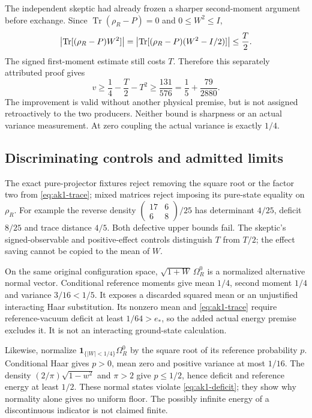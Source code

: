 The independent skeptic had already frozen a sharper second-moment argument before exchange. Since $\operatorname{Tr}(\rho_R-P)=0$ and $0\le W^2\le I$,
\begin{equation}
 \left|\operatorname{Tr}[(\rho_R-P)W^2]\right|
 =\left|\operatorname{Tr}[(\rho_R-P)(W^2-I/2)]\right|
 \le\frac T2.
 \label{eq:ak1-effect}
\end{equation}
The signed first-moment estimate still costs $T$. Therefore this separately attributed proof gives
\begin{equation}
 v\ge\frac14-\frac T2-T^2
 \ge\frac{131}{576}=\frac15+\frac{79}{2880}.
 \label{eq:ak1-skeptic-floor}
\end{equation}
The improvement is valid without another physical premise, but is not assigned retroactively to the two producers. Neither bound is sharpness or an actual variance measurement. At zero coupling the actual variance is exactly $1/4$.

\subsection{Discriminating controls and admitted limits}
The exact pure-projector fixtures reject removing the square root or the factor two from \eqref{eq:ak1-trace}; mixed matrices reject imposing its pure-state equality on $\rho_R$. For example the reverse density $\left(\begin{smallmatrix}17&6\\6&8\end{smallmatrix}\right)/25$ has determinant $4/25$, deficit $8/25$ and trace distance $4/5$. Both defective upper bounds fail. The skeptic's signed-observable and positive-effect controls distinguish $T$ from $T/2$; the effect saving cannot be copied to the mean of $W$.

On the same original configuration space, $\sqrt{1+W}\,\Omega_R^0$ is a normalized alternative normal vector. Conditional reference moments give mean $1/4$, second moment $1/4$ and variance $3/16<1/5$. It exposes a discarded squared mean or an unjustified interacting Haar substitution. Its nonzero mean and \eqref{eq:ak1-trace} require reference-vacuum deficit at least $1/64>e_*$, so the added actual energy premise excludes it. It is not an interacting ground-state calculation.

Likewise, normalize $\mathbf1_{\{|W|<1/4\}}\Omega_R^0$ by the square root of its reference probability $p$. Conditional Haar gives $p>0$, mean zero and positive variance at most $1/16$. The density $(2/\pi)\sqrt{1-w^2}$ and $\pi>2$ give $p\le1/2$, hence deficit and reference energy at least $1/2$. These normal states violate \eqref{eq:ak1-deficit}; they show why normality alone gives no uniform floor. The possibly infinite energy of a discontinuous indicator is not claimed finite.

